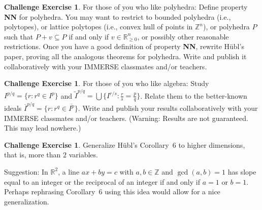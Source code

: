 \documentclass{amsart}
\theoremstyle{plain}
\theoremstyle{definition}
\newtheorem{chexercise}[theorem]{Challenge Exercise}
\theoremstyle{definition}
\newcommand{\Z}{\mathbb{Z}}
\newcommand{\R}{\mathbb{R}}
\begin{document}
\begin{chexercise}
For those of you who like polyhedra:
Define property \textbf{NN} for polyhedra.
You may want to restrict to bounded polyhedra (i.e., polytopes),
or lattice polytopes (i.e., convex hull of points in $\Z^n$), or polyhedra $P$
such that $P + v \subseteq P$ if and only if $v \in \R_{\geq 0}^n$,
or possibly other reasonable restrictions.
Once you have a good definition of property \textbf{NN},
rewrite H\"ubl's paper, proving all the analogous theorems for polyhedra.
Write and publish it collaboratively with your IMMERSE classmates
and/or teachers.
\end{chexercise}

\begin{chexercise}
For those of you who like algebra:
Study $I^{p/q} = \{ r : r^q \in I^p \}$
and $\tilde{I}^{p/q} = \bigcup \{ I^{r/s} : \frac{r}{s} = \frac{p}{q} \}$.
Relate them to the better-known ideals
$\overline{I}^{p/q} = \{ r : r^q \in \overline{I^p} \}$.
Write and publish your results collaboratively with your IMMERSE classmates
and/or teachers.
(Warning: Results are not guaranteed. This may lead nowhere.)
\end{chexercise}



\begin{chexercise}
Generalize H\"ubl's Corollary~6 to higher dimensions, that is, more than $2$ variables.

Suggestion: In $\R^2$, a line $ax+by=c$ with $a,b \in \Z$ and $\gcd(a,b)=1$
has slope equal to an integer or the reciprocal of an integer if and only if $a=1$ or $b=1$.
Perhaps rephrasing Corollary~6 using this idea would allow for a nice generalization.
\end{chexercise}
\end{document}
